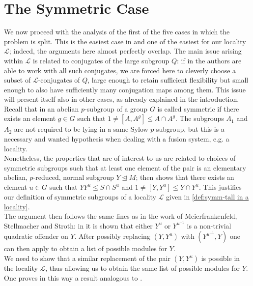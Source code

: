 \documentclass{amsart}
\numberwithin{equation}{section}
\theoremstyle{definition}
\theoremstyle{subresult}
\theoremstyle{caseresult}
\renewcommand{\L}{\mathcal{L}}
\newcommand{\norm}{\trianglelefteq}
\newcommand{\inv}{^{-1}}
\newcommand{\<}{\langle}
\renewcommand{\>}{\rangle}
\begin{document}
\section{The Symmetric Case}
\label{symm case}

We now proceed with the analysis of the first of the five cases in which the problem is split. This is the easiest case in \cite{Meier-Stell-Stroth:2012} and one of the easiest for our locality $\L$;  indeed, the arguments here almost perfectly overlap. The main issue arising within $\L$ is related to conjugates of the large subgroup $Q$: if in \cite{Meier-Stell-Stroth:2012} the authors are able to work with all such conjugates, we are forced here to cleverly choose a subset of $\L$-conjugates of $Q$, large enough to retain sufficient flexibility but small enough to also have sufficiently many conjugation maps among them. This issue will present itself also in other cases, as already explained in the introduction.\\

Recall that in \cite{Meier-Stell-Stroth:2012} an abelian $p$-subgroup of a group $G$ is called symmetric if there exists an element $g \in G$ such that $1 \ne [A, A^g] \le A \cap A^g$. The subgroups $A_1$ and $A_2$ are not required to be lying in a same Sylow $p$-subgroup, but this is a necessary and wanted hypothesis when dealing with a fusion system, e.g. a locality.\\
Nonetheless, the properties that are of interest to us are related to choices of symmetric subgroups such that at least one element of the pair is an elementary abelian, $p$-reduced, normal subgroup $Y \norm M$; then \cite[Lemma 4.2]{Meier-Stell-Stroth:2012} shows that there exists an element $u \in G$ such that $YY^u \le S \cap S^u$ and $1 \ne [Y,Y^u] \le Y \cap Y^u$. This justifies our definition of symmetric subgroups of a locality $\L$ given in \ref{def:symm-tall in a locality}.\\
The argument then follows the same lines as in the work of Meierfrankenfeld, Stellmacher and Stroth: in \cite[Lemma 4.9 (c)]{Meier-Stell-Stroth:2012} it is shown that either $Y^u$ or $Y^{u\inv}$ is a non-trivial quadratic offender on $Y$. After possibly replacing $(Y,Y^u)$ with $(Y^{u\inv},Y)$ one can then apply \cite[$Q!FF$-Module Theorem]{MS:2012a} to obtain a list of possible modules for $Y$.\\
We need to show that a similar replacement of the pair $(Y,Y^u)$ is possible in the locality $\L$, thus allowing us to obtain the same list of possible modules for $Y$. One proves in this way a result analogous to \cite[Theorem D]{Meier-Stell-Stroth:2012}.
\end{document}
